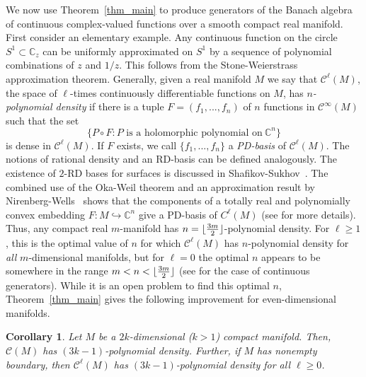 \documentclass[10pt]{amsart}
\numberwithin{equation}{section}
\theoremstyle{definition}
\theoremstyle{definition}
\theoremstyle{plain}
\newtheorem{cor}[theorem]{Corollary}
\DeclarePairedDelimiter\floor{\lfloor}{\rfloor}
\newcommand{\bes} {\begin{equation*}}
\newcommand{\ees} {\end{equation*}}
\newcommand{\cont}{\mathcal{C}}
\newcommand{\Cn}{\mathbb{C}^n}
\newcommand{\C} {\mathbb{C}}
\begin{document}
We now use Theorem~\ref{thm_main} to produce generators of the Banach algebra of continuous complex-valued functions over a smooth compact
real manifold. First consider an elementary example. Any continuous function on the circle $S^1\subset\C_z$ can be uniformly approximated on $S^1$ by a sequence of polynomial combinations of $z$ and $1/z$. This follows from the Stone-Weierstrass approximation theorem.  Generally, given a real manifold $M$ we say that $\cont^\ell(M)$, the space of $\ell$-times continuously differentiable functions on $M$, has {\em $n$-polynomial density} if there is a tuple $F=(f_1,...,f_n)$ of $n$ functions 
in $\cont^\infty(M)$ such that the set
\bes
\{P\circ F :P\text{ is a holomorphic polynomial on}\ \Cn\}
\ees
is dense in $\cont^\ell(M)$. If $F$ exists, we call $\{f_1,...,f_n\}$ a {\em PD-basis} of $\cont^\ell(M)$. The notions of rational density and an RD-basis can be defined analogously. The existence of $2$-RD bases for surfaces is discussed in Shafikov-Sukhov~\cite{ShSu15}. The combined use of the Oka-Weil theorem and an approximation result by Nirenberg-Wells~\cite[Theorem 1]{NiWe67} shows that the components of a totally real and polynomially convex embedding
$F: M \hookrightarrow \mathbb C^n$ give a PD-basis of $C^\ell(M)$ (see \cite{GuSh17} for more details). Thus, any compact real $m$-manifold has $n=\floor{\frac{3m}{2}}$-polynomial density. For $\ell\geq 1$, this is the optimal value of $n$ for which $\cont^\ell(M)$ has $n$-polynomial density for {\it all} $m$-dimensional manifolds, but for $\ell=0$ the optimal $n$ appears to be somewhere in the range $m<n<\floor{\frac{3m}{2}}$ (see \cite{VoZa71} for the case of continuous generators). While it is an open problem to find this optimal $n$, Theorem~\ref{thm_main} gives the following improvement for even-dimensional manifolds. 

\begin{cor}\label{cor_dens}
Let $M$ be a $2k$-dimensional ($k>1$) compact manifold. Then, $\cont(M)$ has $(3k-1)$-polynomial density. Further, if $M$ has nonempty boundary, then $\cont^\ell(M)$ has $(3k-1)$-polynomial density for all $\ell\geq 0$.
\end{cor}
\end{document}
